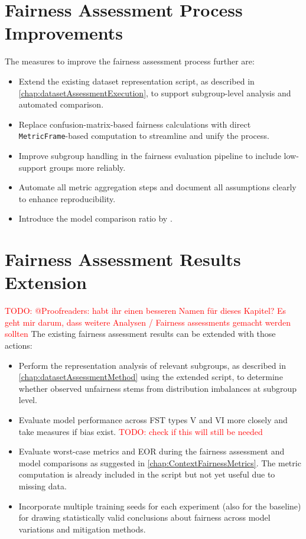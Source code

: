 \documentclass[12pt, a4paper, oneside]{book}   	%
\renewcommand{\todo}[1]{\textcolor{red}{TODO: #1}}
\begin{document}
		
		\section{Fairness Assessment Process Improvements}
		The measures to improve the fairness assessment process further are:
		\begin{itemize}
			\item Extend the existing dataset representation script, as described in \autoref{chap:datasetAssessmentExecution}, to support subgroup-level analysis and automated comparison.
			\item Replace confusion-matrix-based fairness calculations with direct \texttt{MetricFrame}-based computation to streamline and unify the process.
			\item Improve subgroup handling in the fairness evaluation pipeline to include low-support groups more reliably.
			\item Automate all metric aggregation steps and document all assumptions clearly to enhance reproducibility.
			\item Introduce the model comparison ratio by \textcite{Valentim_2019}.
		\end{itemize}		
		
		\section{Fairness Assessment Results Extension}
		\todo{@Proofreaders: habt ihr einen besseren Namen für dieses Kapitel? Es geht mir darum, dass weitere Analysen / Fairness assessments gemacht werden sollten}
		The existing fairness assessment results can be extended with those actions:
		\begin{itemize}
			\item Perform the representation analysis of relevant subgroups, as described in \autoref{chap:datasetAssessmentMethod} using the extended script, to determine whether observed unfairness stems from distribution imbalances at subgroup level.	
			
			\item Evaluate model performance across \gls{FST} types V and VI more closely and take measures if bias exist. \todo{check if this will still be needed}
			
			\item Evaluate worst-case metrics and \gls{EOR} during the fairness assessment and model comparisons as suggested in \autoref{chap:ContextFairnessMetrics}. The metric computation is already included in the script but not yet useful due to missing data.
			
			\item Incorporate multiple training seeds for each experiment (also for the baseline) for drawing statistically valid conclusions about fairness across model variations and mitigation methods.
		\end{itemize}
		
\end{document}
